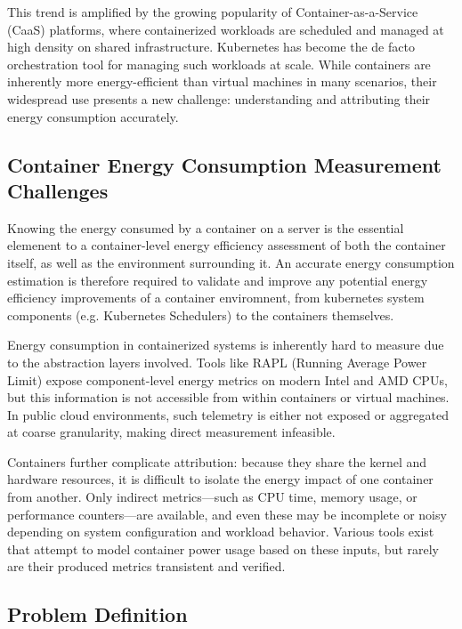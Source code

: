 This trend is amplified by the growing popularity of Container-as-a-Service (CaaS) platforms, where containerized workloads are scheduled and managed at high density on shared infrastructure. Kubernetes has become the de facto orchestration tool for managing such workloads at scale. While containers are inherently more energy-efficient than virtual machines in many scenarios\parencite{Morabito2015}, their widespread use presents a new challenge: understanding and attributing their energy consumption accurately.

\subsection{Container Energy Consumption Measurement Challenges}

Knowing the energy consumed by a container on a server is the essential elemenent to a container-level energy efficiency assessment of both the container itself, as well as the environment surrounding it. An accurate energy consumption estimation is therefore required to validate and improve any potential energy efficiency improvements of a container enviromnent, from kubernetes system components (e.g. Kubernetes Schedulers) to the containers themselves.

Energy consumption in containerized systems is inherently hard to measure due to the abstraction layers involved. Tools like RAPL (Running Average Power Limit) expose component-level energy metrics on modern Intel and AMD CPUs, but this information is not accessible from within containers or virtual machines. In public cloud environments, such telemetry is either not exposed or aggregated at coarse granularity, making direct measurement infeasible.

Containers further complicate attribution: because they share the kernel and hardware resources, it is difficult to isolate the energy impact of one container from another. Only indirect metrics—such as CPU time, memory usage, or performance counters—are available, and even these may be incomplete or noisy depending on system configuration and workload behavior. Various tools exist that attempt to model container power usage based on these inputs, but rarely are their produced metrics transistent and verified.

\subsection{Problem Definition}


